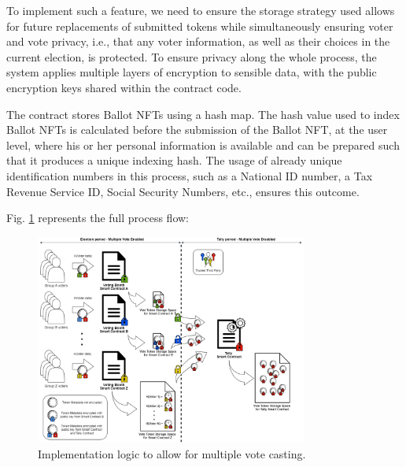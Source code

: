 \documentclass[../main.tex]{subfiles}
\begin{document}
\par
To implement such a feature, we need to ensure the storage strategy used allows for future replacements of submitted tokens while simultaneously ensuring voter and vote privacy, i.e., that any voter information, as well as their choices in the current election, is protected. To ensure privacy along the whole process, the system applies multiple layers of encryption to sensible data, with the public encryption keys shared within the contract code.
\par
The contract stores Ballot NFTs using a hash map. The hash value used to index Ballot NFTs is calculated before the submission of the Ballot NFT, at the user level, where his or her personal information is available and can be prepared such that it produces a unique indexing hash. The usage of already unique identification numbers in this process, such as a National ID number, a Tax Revenue Service ID, Social Security Numbers, etc., ensures this outcome.
\par
Fig. \ref{fig:multiple_vote_casting} represents the full process flow:

\begin{figure}[htp]
    \centering
    \includegraphics[width=0.8\textwidth]{../Images/MultipleVoteCastingLogic.png}
    \caption{Implementation logic to allow for multiple vote casting.}
    \label{fig:multiple_vote_casting}
\end{figure}
\end{document}
